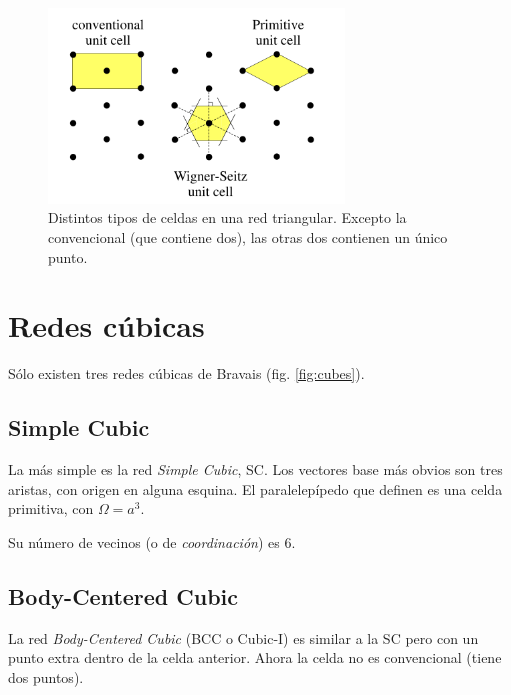 \begin{figure}
  \centering
  \includegraphics[width=0.7\textwidth]{figures/celdas.png}
  \caption{Distintos tipos de celdas en una red triangular. Excepto la
    convencional (que contiene dos), las otras dos contienen un único
    punto.}
  \label{fig:celdas}
\end{figure}

\section{Redes cúbicas}
Sólo existen tres redes cúbicas de Bravais (fig. \ref{fig:cubes}).

\subsection{Simple Cubic} 
La más simple es la red \emph{Simple Cubic}, SC. Los vectores
  base más obvios son tres aristas, con origen en alguna esquina. El
  paralelepípedo que definen es una celda primitiva, con $\Omega = a^3$.

  Su número de vecinos (o de \emph{coordinación}) es 6.
\subsection{Body-Centered Cubic} 
La red \emph{Body-Centered Cubic} (BCC o Cubic-I) es similar a la SC pero
  con un punto extra dentro de la celda anterior. Ahora la celda no es
  convencional (tiene dos puntos).

